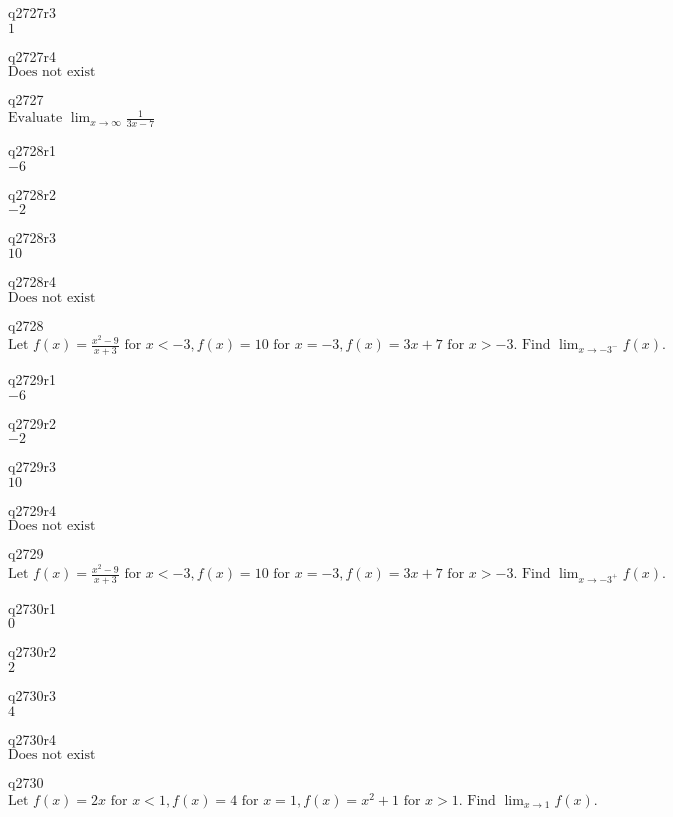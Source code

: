 q2727r3\\
\(\displaystyle 1 \)

q2727r4\\
\(\displaystyle \text{Does not exist} \)

q2727\\
\(\displaystyle \text{Evaluate } \lim_{x \rightarrow \infty} \frac{1}{3x-7} \)

q2728r1\\
\(\displaystyle -6 \)

q2728r2\\
\(\displaystyle -2 \)

q2728r3\\
\(\displaystyle 10 \)

q2728r4\\
\(\displaystyle \text{Does not exist} \)

q2728\\
\(\displaystyle \text{Let } f(x) = \frac{x^2 - 9}{x+3} \text{ for } x < -3, f(x) = 10 \text{ for } x = -3, f(x) = 3x+7 \text{ for } x > -3. \text{ Find } \lim_{x \rightarrow -3^-} f(x). \)

q2729r1\\
\(\displaystyle -6 \)

q2729r2\\
\(\displaystyle -2 \)

q2729r3\\
\(\displaystyle 10 \)

q2729r4\\
\(\displaystyle \text{Does not exist} \)

q2729\\
\(\displaystyle \text{Let } f(x) = \frac{x^2 - 9}{x+3} \text{ for } x < -3, f(x) = 10 \text{ for } x = -3, f(x) = 3x+7 \text{ for } x > -3. \text{ Find } \lim_{x \rightarrow -3^+} f(x). \)

q2730r1\\
\(\displaystyle 0 \)

q2730r2\\
\(\displaystyle 2 \)

q2730r3\\
\(\displaystyle 4 \)

q2730r4\\
\(\displaystyle \text{Does not exist} \)

q2730\\
\(\displaystyle \text{Let } f(x) = 2x \text{ for } x < 1, f(x) = 4 \text{ for } x = 1, f(x) = x^2 + 1 \text{ for } x > 1. \text{ Find } \lim_{x \rightarrow 1} f(x). \)

